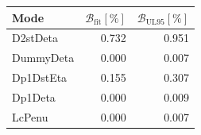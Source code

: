 \begin{tabular}{lrr}
\hline
Mode & $\mathcal{B}_{\mathrm{fit}}[\%]$ & $\mathcal{B}_{\mathrm{UL95}}[\%]$ \\
\hline
D2stDeta & 0.732 & 0.951 \\
DummyDeta & 0.000 & 0.007 \\
Dp1DstEta & 0.155 & 0.307 \\
Dp1Deta & 0.000 & 0.009 \\
LcPenu & 0.000 & 0.007 \\
\hline
\end{tabular}
